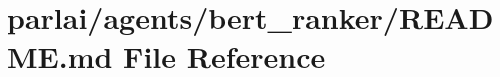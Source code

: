 \hypertarget{parlai_2agents_2bert__ranker_2README_8md}{}\section{parlai/agents/bert\+\_\+ranker/\+R\+E\+A\+D\+ME.md File Reference}
\label{parlai_2agents_2bert__ranker_2README_8md}
